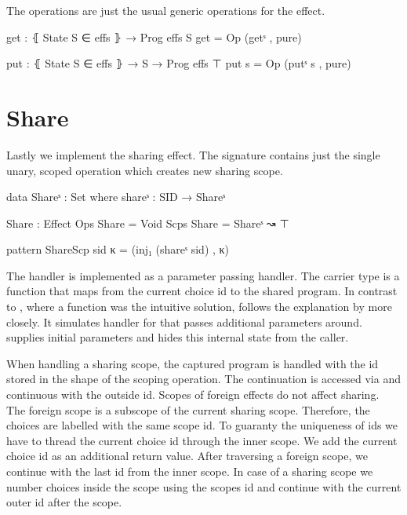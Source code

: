 The operations are just the usual generic operations for the effect.

\begin{code}
get : ⦃ State S ∈ effs ⦄ → Prog effs S
get = Op (getˢ , pure)

put : ⦃ State S ∈ effs ⦄ → S → Prog effs ⊤
put s = Op (putˢ s , pure)
\end{code}


\section{Share}

Lastly we implement the sharing effect.
The signature contains just the single unary, scoped operation 
which creates new sharing scope.

\begin{code}
data Shareˢ : Set where shareˢ : SID → Shareˢ

Share : Effect
Ops   Share = Void
Scps  Share = Shareˢ ↝ ⊤

pattern ShareScp sid κ = (inj₁ (shareˢ sid) , κ)
\end{code}
The handler is implemented as a parameter passing handler.
The carrier type is a function that maps from the current choice id to the
shared program.
In contrast to , where a function was the intuitive solution,
 follows the explanation by
\textcite{DBLP:conf/esop/PlotkinP09} more closely.
It simulates handler for  that passes additional parameters
around.
 supplies initial parameters and hides this internal
state from the caller.

When handling a sharing scope, the captured program is handled with the id stored
in the shape of the scoping operation.
The continuation is accessed via \AgdaFunction{>>=} and continuous with the
outside id.
Scopes of foreign effects do not affect sharing.
The foreign scope is a subscope of the current sharing scope.
Therefore, the choices are labelled with the same scope id.
To guaranty the uniqueness of ids we have to thread the current choice id through
the inner scope.
We add the current choice id as an additional return value.
After traversing a foreign scope, we continue with the last id from the inner
scope.
In case of a sharing scope we number choices inside the scope using the scopes
id and continue with the current outer id after the scope.

